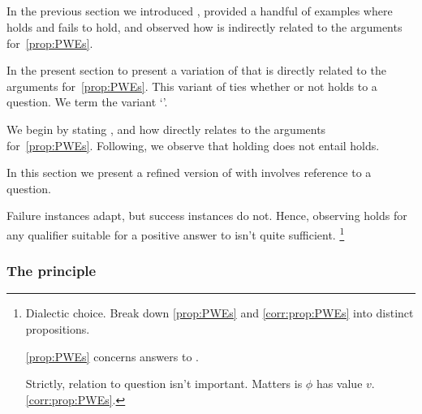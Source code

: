 \subsection{}
\label{cha:zSpA:sec:ptivityq}

\begin{note}
  In the previous section we introduced \ptivity{}, provided a handful of examples where \ptivity{} holds and fails to hold, and observed how \ptivity{} is indirectly related to the arguments for~\autoref{prop:PWEs}.

  In the present section to present a variation of \ptivity{} that is directly related to the arguments for~\autoref{prop:PWEs}.
  This variant of \ptivity{} ties whether or not \ptivity{} holds to a question.
  We term the variant `\ptivityQ{}'.

  We begin by stating \ptivityQ{}, and how \ptivityQ{} directly relates to the arguments for~\autoref{prop:PWEs}.
  Following, we observe that \ptivity{} holding does not entail \ptivityQ{} holds.
\end{note}

\begin{note}
  In this section we present a refined version of \ptivity{} with involves reference to a question.

  Failure instances adapt, but success instances do not.
  Hence, observing \ptivity{} holds for any qualifier suitable for a positive answer to \qzS{} isn't quite sufficient.%
  \footnote{
    Dialectic choice.
    Break down \autoref{prop:PWEs} and \autoref{corr:prop:PWEs} into distinct propositions.

    \autoref{prop:PWEs} concerns answers to \qzS{}.

    Strictly, relation to question isn't important.
    Matters is \(\phi\) has value \(v\).
    \autoref{corr:prop:PWEs}.
  }
\end{note}

\subsubsection{The principle}

